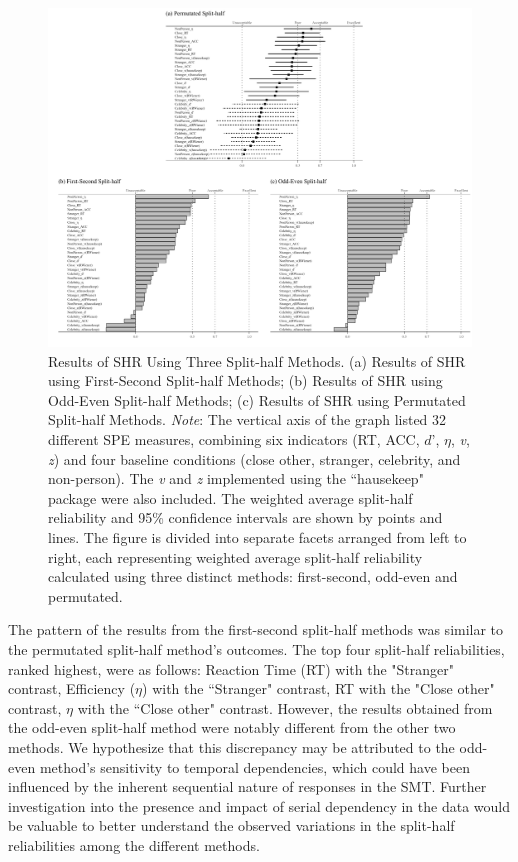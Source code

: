\documentclass[sn-apa]{sn-jnl}%
\theoremstyle{thmstyleone}%
\theoremstyle{thmstyletwo}%
\theoremstyle{thmstylethree}%
\begin{document}
\begin{figure}[ht]
	\centering
	\includegraphics[width=1\textwidth]{./Figure/Fig3_SHR.png}
	\caption[Results of SHR Using Three Split-half Methods]{Results of SHR Using Three Split-half Methods. (a) Results of SHR using First-Second Split-half Methods; (b) Results of SHR using Odd-Even Split-half Methods; (c) Results of SHR using Permutated Split-half Methods.  \textit{Note}: The vertical axis of the graph listed 32 different SPE measures, combining six indicators (RT, ACC, $d’$, $\eta$, \textit{v}, \textit{z}) and four baseline conditions (close other, stranger, celebrity, and non-person). The \textit{v} and \textit{z} implemented using the ``hausekeep" package were also included. The weighted average split-half reliability and 95\% confidence intervals are shown by points and lines. The figure is divided into separate facets arranged from left to right, each representing weighted average split-half reliability calculated using three distinct methods: first-second, odd-even and permutated. 
	}\label{fig:SHR_Result}
\end{figure}


The pattern of the results from the first-second split-half methods was similar to the permutated split-half method’s outcomes. The top four split-half reliabilities, ranked highest, were as follows: Reaction Time (RT) with the "Stranger" contrast, Efficiency ($\eta$) with the ``Stranger" contrast, RT with the "Close other" contrast, $\eta$ with the ``Close other" contrast. However, the results obtained from the odd-even split-half method were notably different from the other two methods. We hypothesize that this discrepancy may be attributed to the odd-even method’s sensitivity to temporal dependencies, which could have been influenced by the inherent sequential nature of responses in the SMT. Further investigation into the presence and impact of serial dependency in the data would be valuable to better understand the observed variations in the split-half reliabilities among the different methods. 
\end{document}
